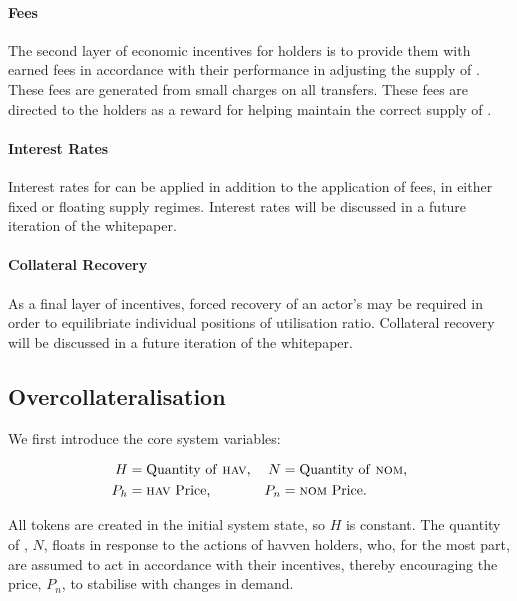 \paragraph{Fees}

\noindent The second layer of economic incentives for \HAV{} holders is to provide them with earned fees in accordance with their performance in adjusting the supply of \NOM{}. These fees are generated from small charges on all \NOM{} transfers. These fees are directed to the \HAV{} holders as a reward for helping maintain the correct supply of \NOM{}.

\paragraph{Interest Rates}

\noindent Interest rates for \HAV{} can be applied in addition to the application of fees, in either fixed or floating \HAV{} supply regimes. Interest rates will be discussed in a future iteration of the whitepaper.

\paragraph{Collateral Recovery}

\noindent As a final layer of incentives, forced recovery of an actor's \HAV{} may be required in order to equilibriate individual positions of utilisation ratio. Collateral recovery will be discussed in a future iteration of the whitepaper.

\subsection{Overcollateralisation}

\noindent We first introduce the core system variables:

\begin{align*}
H &= \text{Quantity of \textsc{hav}{},} & N &= \text{Quantity of \textsc{nom}{},} \\
P_h &= \text{\textsc{hav}{} Price,}  & P_n &= \text{\textsc{nom}{} Price.}
\end{align*}

\noindent All \HAV{} tokens are created in the initial system state, so $H$ is constant. The quantity of \NOM{}, $N$, floats in response to the actions of havven holders, who, for the most part, are assumed to act in accordance with their incentives, thereby encouraging the \NOM{} price, $P_n$, to stabilise with changes in demand.

